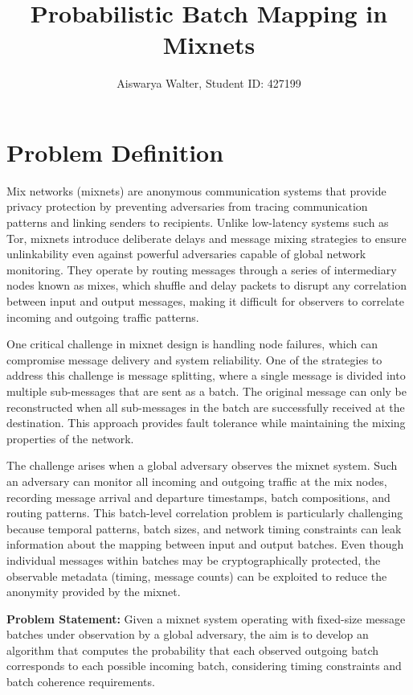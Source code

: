 \documentclass{article}
\title{Probabilistic Batch Mapping in Mixnets}
\author{Aiswarya Walter, Student ID: 427199}
\date{}
\begin{document}
\maketitle

\section{Problem Definition}
\label{sec:problem}

Mix networks (mixnets) are anonymous communication systems that 
provide privacy protection by preventing 
adversaries from tracing communication patterns and 
linking senders to recipients. Unlike low-latency 
systems such as Tor, mixnets introduce deliberate 
delays and message mixing strategies to ensure 
 unlinkability even against powerful 
adversaries capable of global network monitoring. 
They operate by routing messages through a series 
of intermediary nodes known as mixes, which 
shuffle and delay packets to disrupt any 
correlation between input and output messages, 
making it difficult for observers to correlate 
incoming and outgoing traffic patterns.

One critical challenge in mixnet design is handling node failures, which 
can compromise message delivery and system reliability. One of the strategies 
to address this challenge is message splitting, where a single  
message is divided into multiple sub-messages that are sent as a batch. 
The original message can only be reconstructed when all sub-messages in 
the batch are successfully received at the destination. This approach 
provides fault tolerance while maintaining the mixing properties of 
the network.

The challenge arises when a global adversary observes 
the mixnet system. Such an adversary can monitor all incoming and outgoing 
traffic at the mix nodes, recording message arrival and departure timestamps, 
batch compositions, and routing patterns. This batch-level 
correlation problem is particularly challenging because 
temporal patterns, batch sizes, and network timing constraints can leak 
information about the mapping between input and output batches. Even 
though individual messages within batches may be cryptographically 
protected, the observable metadata (timing, message counts) 
can be exploited to reduce the anonymity provided by the mixnet.

\textbf{Problem Statement:} Given a mixnet system operating with fixed-size 
message batches under observation by a global adversary, the aim is to develop 
an algorithm that computes the probability 
that each observed outgoing batch corresponds to each possible incoming 
batch, considering timing constraints and batch coherence requirements.
\end{document}
